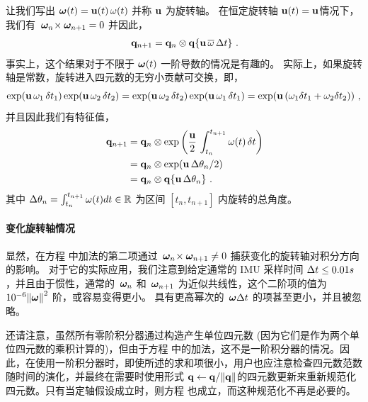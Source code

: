 让我们写出 ${\bm \omega}(t)={\bf u}(t)\,\omega(t)$ 并称 ${\bf u}$ 为旋转轴。
在恒定旋转轴 ${\bf u}(t) = {\bf u}$情况下，我们有 $\,{\bm \omega}_n\!\times\!\,{\bm \omega}_{n+1}=0$ 并因此，
%
\begin{align}\label{equ:first_order_constant_axis}
\,{\bf q}_{n+1} = {\bf q}_n\otimes{\bf q}\{{\bf u}\,\overline\omega\,\Delta t\}~.
\end{align}
%
事实上，这个结果对于不限于 ${\bm \omega}(t)$ 一阶导数的情况是有趣的。
实际上，如果旋转轴是常数，旋转进入四元数的无穷小贡献可交换，即， 
%
$$\exp ({\bf u}\,\omega_1\,\delta t_1)\exp ({\bf u}\,\omega_2\,\delta t_2)=\exp ({\bf u}\,\omega_2\,\delta t_2)\exp ({\bf u}\,\omega_1\,\delta t_1)=\exp ({\bf u}\,(\omega_1\delta t_1 + \omega_2\delta t_2))~,$$ 
%
并且因此我们有特征值，
%
\begin{subequations}
\begin{align}
\,{\bf q}_{n+1} 
  &= {\bf q}_n\otimes \exp\left(\frac{{\bf u}}2\,\int_{t_n}^{t_{n+1}}\omega(t)\,\delta t\right) \\
  &= {\bf q}_n\otimes \exp({\bf u}\,\Delta\theta_n/2) \\
  &= {\bf q}_n\otimes {\bf q}\{{\bf u}\,\Delta\theta_n\}~.
\end{align}
\end{subequations}
%
其中 $\Delta\theta_n = \int_{t_n}^{t_{n+1}} \omega(t)dt \in {\mathbb R}$ 为区间 $[t_n,t_{n+1}]$ 内旋转的总角度。


\paragraph{变化旋转轴情况}

显然，在方程  中加法的第二项通过 $\,{\bm \omega}_n\!\times\!\,{\bm \omega}_{n+1}\neq0$ 捕获变化的旋转轴对积分方向的影响。
对于它的实际应用，我们注意到给定通常的 IMU 采样时间 $\Delta t\le0.01s$，并且由于惯性，通常的 $\,{\bm \omega}_n$ 和 $\,{\bm \omega}_{n+1}$ 为近似共线性，这个二阶项的值为 $10^{-6}{\left\|{\bm \omega}\right\|}^2$ 阶，或容易变得更小。 
具有更高幂次的 $\,{\bm \omega}\Delta t$ 的项甚至更小，并且被忽略。 


还请注意，虽然所有零阶积分器通过构造产生单位四元数 (因为它们是作为两个单位四元数的乘积计算的)，但由于方程  中的加法，这不是一阶积分器的情况。因此，在使用一阶积分器时，即使所述的求和项很小，用户也应注意检查四元数范数随时间的演化，并最终在需要时使用形式 ${\bf q}\gets{\bf q}/{\left\|{\bf q}\right\|}$的四元数更新来重新规范化四元数。只有当定轴假设成立时，则方程  也成立，而这种规范化不再是必要的。 


